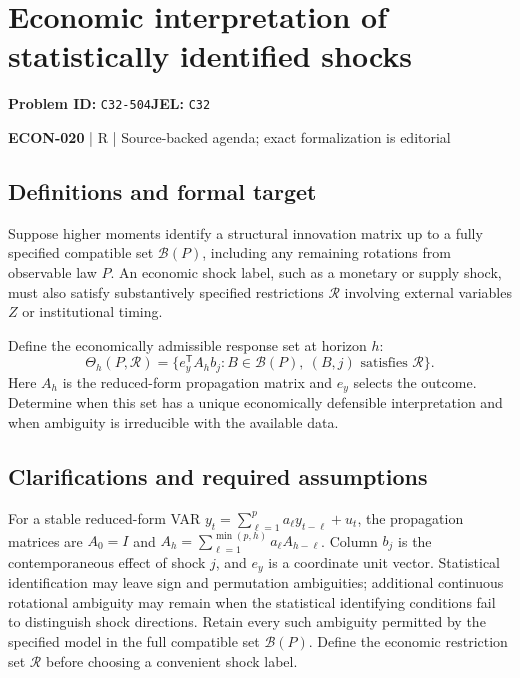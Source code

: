 \documentclass[11pt,a4paper]{article}
\begin{document}
\section*{Economic interpretation of statistically identified shocks}
\textbf{Problem ID:} \texttt{C32-504}\quad \textbf{JEL:} \texttt{C32}\par
\label{problem:OP-0604}


\label{audited:ECON-020}

{\sffamily\small\color{muted}\textbf{ECON-020} | R | Source-backed agenda; exact formalization is editorial\par}

\subsection*{Definitions and formal target}

Suppose higher moments identify a structural innovation matrix up to a fully specified compatible set $\mathcal B(P)$, including any remaining rotations from observable law $P$. An economic shock label, such as a monetary or supply shock, must also satisfy substantively specified restrictions $\mathcal R$ involving external variables $Z$ or institutional timing.

Define the economically admissible response set at horizon $h$:
\[
 \Theta_h(P,\mathcal R)=
 \{e_y^{\mathsf T}A_h b_j:B\in\mathcal B(P),\ (B,j)\text{ satisfies }\mathcal R\}.
\]
Here $A_h$ is the reduced-form propagation matrix and $e_y$ selects the outcome. Determine when this set has a unique economically defensible interpretation and when ambiguity is irreducible with the available data.

\subsection*{Clarifications and required assumptions}

For a stable reduced-form VAR $y_t=\sum_{\ell=1}^pa_\ell y_{t-\ell}+u_t$, the propagation matrices are $A_0=I$ and $A_h=\sum_{\ell=1}^{\min(p,h)}a_\ell A_{h-\ell}$. Column $b_j$ is the contemporaneous effect of shock $j$, and $e_y$ is a coordinate unit vector. Statistical identification may leave sign and permutation ambiguities; additional continuous rotational ambiguity may remain when the statistical identifying conditions fail to distinguish shock directions. Retain every such ambiguity permitted by the specified model in the full compatible set $\mathcal B(P)$. Define the economic restriction set $\mathcal R$ before choosing a convenient shock label.
\end{document}
